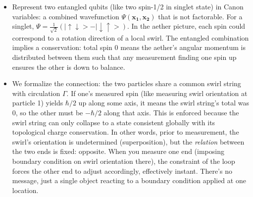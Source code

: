 \documentclass[11pt]{article}
\begin{document}
\begin{itemize}

\item 
Represent two entangled qubits (like two spin-1/2 in singlet state) in Canon variables: a combined wavefunction $\Psi(\mathbf{x_1}, \mathbf{x_2})$ that is not factorable. For a singlet, $\Psi = \frac{1}{\sqrt{2}}(|\uparrow\downarrow> - |\downarrow\uparrow>)$. In the aether picture, each spin could correspond to a rotation direction of a local swirl. The entangled combination implies a conservation: total spin 0 means the aether’s angular momentum is distributed between them such that any measurement finding one spin up ensures the other is down to balance.




\item 
We formalize the connection: the two particles share a common swirl string with circulation $\Gamma$. If one’s measured spin (like measuring swirl orientation at particle 1) yields $\hbar/2$ up along some axis, it means the swirl string’s total was 0, so the other must be $-\hbar/2$ along that axis. This is enforced because the swirl string can only collapse to a state consistent globally with its topological charge conservation. In other words, prior to measurement, the swirl’s orientation is undetermined (superposition), but the \textit{relation} between the two ends is fixed: opposite. When you measure one end (imposing boundary condition on swirl orientation there), the constraint of the loop forces the other end to adjust accordingly, effectively instant. There’s no message, just a single object reacting to a boundary condition applied at one location.





\end{itemize}
\end{document}
